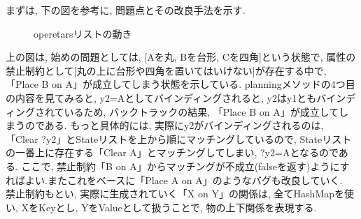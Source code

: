 \documentclass[uplatex,12pt]{jsarticle}
\begin{document}
まずは, 下の図を参考に, 問題点とその改良手法を示す.
\begin{figure}[htbp]
 \begin{center}
 \end{center}
 \caption[]{operetarsリストの動き}\label{fig:fig1.1}
\end{figure}
上の図は, 始めの問題としては, [Aを丸, Bを台形, Cを四角]という状態で, 属性の禁止制約として[丸の上に台形や四角を置いてはいけない]が存在する中で, 「Place B on A」が成立してしまう状態を示している. planningメソッドの4つ目の内容を見てみると, y2=Aとしてバインディングされると, y2はy1ともバインディングされているため, バックトラックの結果, 「Place B on A」が成立してしまうのである. もっと具体的には, 実際にy2がバインディングされるのは, 「Clear ?y2」とStateリストを上から順にマッチングしているので, Stateリストの一番上に存在する「Clear A」とマッチングしてしまい, ?y2=Aとなるのである. ここで, 禁止制約「B on A」からマッチングが不成立(falseを返す)ようにすればよい.またこれをベースに「Place A on A」のようなバグも改良していく.\\

禁止制約もとい, 実際に生成されていく「X on Y」の関係は, 全てHashMapを使い, XをKeyとし, YをValueとして扱うことで, 物の上下関係を表現する.\\
\end{document}
